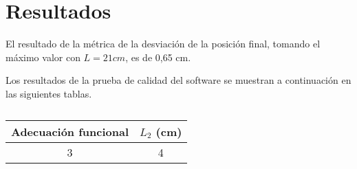 \section{Resultados}

El resultado de la métrica de la desviación de la posición final, tomando el máximo valor con $L = 21 cm$, es de 0,65 cm.

Los resultados de la prueba de calidad del software se muestran a continuación en las siguientes tablas.

\begin{table}[ht]
	\centering
	\begin{tabular}{|c|c|}
		\hline
		\textbf{Adecuación funcional} & \textbf{$L_2$ (cm)} \\
		\hline
		3 & 4 \\
		\hline
	\end{tabular}
	\caption{}
	\label{tab:Resultados}
\end{table}